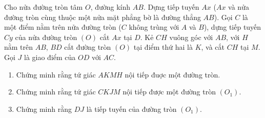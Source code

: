     
    
    \begin{bt}%
    Cho nửa đường tròn tâm $O$, đường kính $AB$. Dựng tiếp tuyến $Ax$ ($Ax$ và nửa đường tròn cùng thuộc một nửa mặt phẳng bờ là đường thẳng $AB$). Gọi $C$ là một điểm nằm trên nửa đường tròn ($C$ không trùng với $A$ và $B$), dựng tiếp tuyến $Cy$ của nửa đường tròn $(O)$ cắt $Ax$ tại $D$. Kẻ $CH$ vuông góc với $AB$, với $H$ nằm trên $AB$, $BD$ cắt đường tròn $(O)$ tại điểm thứ hai là $K$, và cắt $CH$ tại $M$. Gọi $J$ là giao điểm của $OD$ với $AC$.  
    \begin{enumerate}
        \item Chứng minh rằng tứ giác $AKMH$ nội tiếp đuợc một đường tròn.
        \item Chứng minh rằng tứ giác $CKJM$ nội tiếp được một đường tròn $(O_1)$.
        \item Chứng minh rằng $DJ$ là tiếp tuyến của đường tròn $(O_1)$.
    \end{enumerate}
\end{bt}
